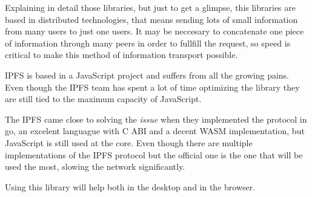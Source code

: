 \documentclass[12pt, letterpaper]{article}
\begin{document}
\begin{multicols}{2}
    Explaining in detail those libraries, but just to get a glimpse, this libraries are based in distributed technologies, that means sending lots of small information from many users to just one users. It may be neccesary to concatenate one piece of information through many peers in order to fullfill the request, so speed is critical to make this method of information transport possible.

    IPFS is based in a JavaScript project and suffers from all the growing pains. Even though the IPFS team has spent a lot of time optimizing the library they are still tied to the maximum capacity of JavaScript.

    The IPFS came close to solving the \textit{issue} when they implemented the protocol in go, an excelent languague with C ABI and a decent WASM implementation, but JavaScript is still used at the core. Even though there are multiple implementations of the IPFS protocol but the official one is the one that will be used the most, slowing the network significantly.

    Using this library will help both in the desktop and in the browser.


\end{multicols}
\end{document}
